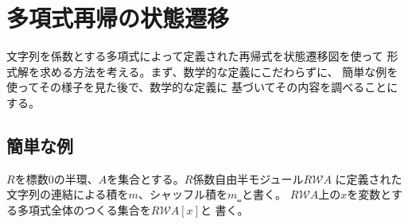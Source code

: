 \begingroup %
	\newcommand{\Tree}{\ensuremath{\mathcal{T}}}
	\newcommand{\treeu}{\ensuremath{1_\Tree}}
	\newcommand{\Forget}{\ensuremath{\mathcal{U}}}
	\newcommand{\Word}{\ensuremath{\mathcal{W}}}
	\newcommand{\wordu}{\ensuremath{1_{\Word}}}
	\newcommand{\word}[1]{\ensuremath{[{#1}]}}
	\newcommand{\push}{\ensuremath{\myop{push}}}
	\newcommand{\pop}{\ensuremath{\myop{pop}}}
	\newcommand{\Nothing}{\ensuremath{\myop{None}}}
	\newcommand{\none}{\ensuremath{\myop{none}}}
	\newcommand{\Maybe}{\ensuremath{\myop{Maybe}}}
	\newcommand{\onto}{\ensuremath{\myop{onto}}}
	\newcommand{\lin}{\ensuremath{\myop{lin}}}
	\newcommand{\map}{\ensuremath{\myop{map}}}
	\newcommand{\defeq}{\ensuremath{\overset{\mathrm{def}}{=}}}
	\newcommand{\dup}{\myop{dup}}
	\newcommand{\myid}{\myop{id}}
	\newcommand{\homset}{\myop{hom}}
\section{多項式再帰の状態遷移}\label{s1:多項式再帰の状態遷移} %
	文字列を係数とする多項式によって定義された再帰式を状態遷移図を使って
	形式解を求める方法を考える。まず、数学的な定義にこだわらずに、
	簡単な例を使ってその様子を見た後で、数学的な定義に
	基づいてその内容を調べることにする。

\subsection{簡単な例}\label{s2:簡単な例} %
	$R$を標数$0$の半環、$A$を集合とする。$R$係数自由半モジュール$R\Word A$
	に定義された文字列の連結による積を$m$、シャッフル積を$m_\shuffle$と書く。
	$R\Word A$上の$x$を変数とする多項式全体のつくる集合を$R\Word A[x]$と
	書く。
	
